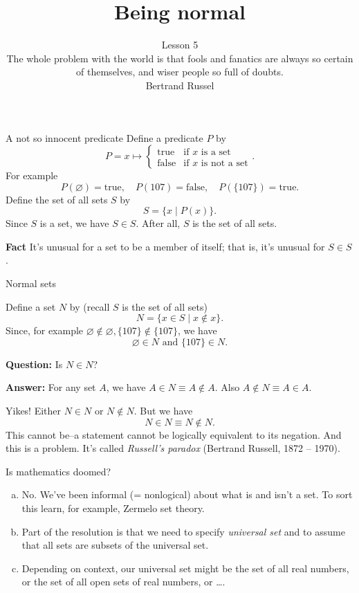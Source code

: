 \documentclass[fleqn]{beamer}
\subtitle{Lesson 5 \\ \vspace{1.0in} The whole problem with the world is that fools and fanatics are always so certain of themselves, and wiser people so full of doubts. \\ \vspace{0.25in} Bertrand Russel}
\title{\textbf{Being normal}}
\date{}
\newcommand{\true}{\mathrm{true}}
\newcommand{\false}{\mathrm{false}}
\theoremstyle{definition}
\newenvironment{alphalist}{
  \vspace{-0.4in}
  \begin{enumerate}[(a)]
    \addtolength{\itemsep}{1.0\itemsep}}
  {\end{enumerate}}
\begin{document}
\frame{\titlepage}

\begin{frame}{A not so innocent predicate}
Define  a predicate \(P\) by
\[
       P = x \mapsto \begin{cases}   \mbox{true}  & \mbox{if } x \mbox{ is a set} \\
        \mbox{false}  & \mbox{if } x \mbox{ is not a  set} \end{cases}.
\]
For example
\[
    P(\varnothing) = \true, \quad    P(107) = \false, \quad P(\{107\}) = \true.
\]
Define the set of all sets \(S\) by
\[
    S = \{x \mid  P(x) \}.
\]
Since \(S\) is a set, we have \(S \in S\).  After all, \(S\) is the set of all sets.

\vspace{0.2in}

\textbf{Fact} It's unusual for a set to be a member of itself; that is, it's unusual for \(S \in S\).

\end{frame}

\begin{frame}{Normal sets}


Define a set \(N\) by  (recall \(S\) is the set of all sets)
\[
     N = \{x \in S \mid x \notin x \}.
\]
Since, for example \(\varnothing \notin \varnothing,  \{107\} \notin \{107\}\), we have
\[
   \varnothing \in N  \mbox{ and } \{107\}  \in N.
\] 

\textbf{Question:}  Is \(N \in N\)?

\vspace{0.2in}

\textbf{Answer:}   For any set \(A\), we have \(A \in N \equiv A \notin A\).  Also  \(A \notin N \equiv A \in A\).

Yikes!  Either \(   N \in N\) or   \(N \not \in N\).  But we have
\[
    N \in N  \equiv  N \notin N.
\]
This cannot be--a statement cannot be logically equivalent to its negation.
 And this is a problem. It's called \emph{Russell's paradox} (Bertrand Russell,  1872 -- 1970). 

\end{frame}

\begin{frame}{Is mathematics doomed?}

\begin{alphalist}

\item No.  We've been informal (= nonlogical) about what is and isn't a set.  To sort this learn, for example, Zermelo set theory. 

\item Part of the resolution is that we need to specify  \emph{universal set} and to assume that all sets are subsets of the universal set.

\item Depending on context, our universal set might be the set of all real numbers, or the set of all open sets of real numbers, or \dots.

\end{alphalist}

\end{frame}
\end{document}
